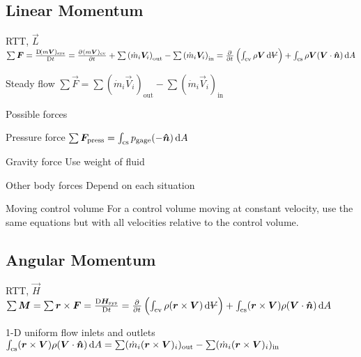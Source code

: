 \documentclass{article}
\begin{document}
\subsection{Linear Momentum}
\begin{description*}
\item[RTT, $\vec{L}$]
  \(\sum{\vec{F}}
  = \frac{\Dif (m\vec{V})_\mathrm{sys}}{\Dif t}
  = \pd{(m\vec{V})_\mathrm{cv}}{t}
  + \sum\left(\dot{m}_i\vec{V}_i\right)_\mathrm{out}
  - \sum\left(\dot{m}_i\vec{V}_i\right)_\mathrm{in}
  = \pd{}{t}\left(\int_\mathrm{cv}\rho\vec{V}\dif{\volsym}\right)
  + \int_\mathrm{cs}\rho\vec{V}(\vec{V}\cdot\uvec{n})\dif{A}\)
\item[Steady flow]
  \(\sum{\vec{F}}
  = \sum\left(\dot{m}_i\vec{V}_i\right)_\mathrm{out}
  - \sum\left(\dot{m}_i\vec{V}_i\right)_\mathrm{in}\)
\item[Possible forces]~
  \begin{description*}
    \item[Pressure force]
      \(\sum\vec{F}_\mathrm{press} = \int_\mathrm{cs}p_\mathrm{gage}(-\uvec{n})\dif{A}\)
    \item[Gravity force] Use weight of fluid
    \item[Other body forces] Depend on each situation
  \end{description*}
\item[Moving control volume] For a control volume moving at constant velocity, use the same
  equations but with all velocities relative to the control volume.
\end{description*}

\subsection{Angular Momentum}
\begin{description*}
\item[RTT, $\vec{H}$]
  \(\sum\vec{M} = \sum\vec{r}\times\vec{F}
  = \frac{\Dif \vec{H}_\mathrm{sys}}{\Dif t}
  = \pd{}{t}\left(\int_\mathrm{cv}\rho(\vec{r}\times\vec{V})\dif{\volsym}\right)
  + \int_\mathrm{cs}(\vec{r}\times\vec{V})\rho(\vec{V}\cdot\uvec{n})\dif{A}\)
\item[1-D uniform flow inlets and outlets]
  \(\int_\mathrm{cs}(\vec{r}\times\vec{V})\rho(\vec{V}\cdot\uvec{n})\dif{A}
  = \sum(\dot{m}_i(\vec{r}\times\vec{V})_i)_\mathrm{out}
  - \sum(\dot{m}_i(\vec{r}\times\vec{V})_i)_\mathrm{in}\)
\end{description*}
\end{document}
